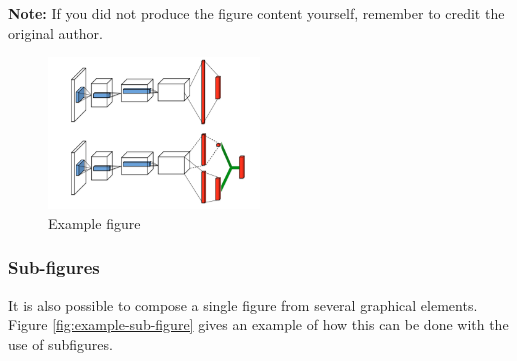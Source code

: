 \textbf{Note:} If you did not produce the figure content yourself, remember to credit the original author.


\begin{figure}[H]  %
    \centering
    \includegraphics[width=0.5\textwidth]{Images/example_figure.png}
    \caption{Example figure}
    \label{fig:example-figure}
\end{figure}


\subsubsection{Sub-figures}

It is also possible to compose a single figure from several graphical elements.
Figure \ref{fig:example-sub-figure} gives an example of how this can be done with the use of subfigures.

